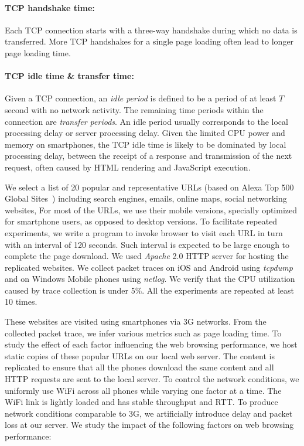 
\paragraph{TCP handshake time:} Each TCP connection starts with a
three-way handshake during which no data is transferred. More TCP 
handshakes for a single page loading often lead to longer page loading 
time.

\paragraph{TCP idle time \& transfer time:} Given a TCP connection, 
an {\it idle period} is defined to be a period of at least $T$ second 
with no network activity. The remaining time periods within the 
connection are {\it transfer periods}. An idle period usually 
corresponds to the local processing delay or server processing 
delay. Given the limited CPU power and memory on smartphones, the 
TCP idle time is likely to be dominated by local processing delay, 
\eg between the receipt of a response and transmission of the next 
request, often caused by HTML rendering and JavaScript execution.

\label{sec:app.setup}

We select a list of 20 popular and representative URLs (based on Alexa Top 500 Global Sites~\cite{alexa}) including search engines, emails, online maps, social networking websites, \etc
For most of the URLs, we use their mobile versions, specially optimized for smartphone users, as opposed to desktop versions. To facilitate repeated experiments, we write a program to invoke browser to visit each URL in turn with an interval of 120 seconds. Such interval is expected to be large enough to complete the page download. We used \emph{Apache} 2.0 HTTP server for hosting the replicated websites. We collect packet traces on iOS and Android using {\em tcpdump} and on Windows Mobile phones using {\em netlog}. We verify that the CPU utilization caused by trace collection is under 5\%. All the experiments are repeated at least 10 times.

These websites are visited using smartphones via 3G networks. From the collected 
packet trace, we infer various metrics such as page loading time.
To study the effect of each factor influencing the web browsing
performance, we host static copies of these popular URLs on our 
local web server. The content is replicated to ensure that all the 
phones download the same content and all HTTP requests are sent to 
the local server. To control the network conditions, we uniformly 
use WiFi across all phones while varying one factor at a time. 
The WiFi link is lightly loaded and has stable throughput and RTT. 
To produce network conditions comparable to 3G, we artificially 
introduce delay and packet loss at our server. We study the impact 
of the following factors on web browsing performance:

